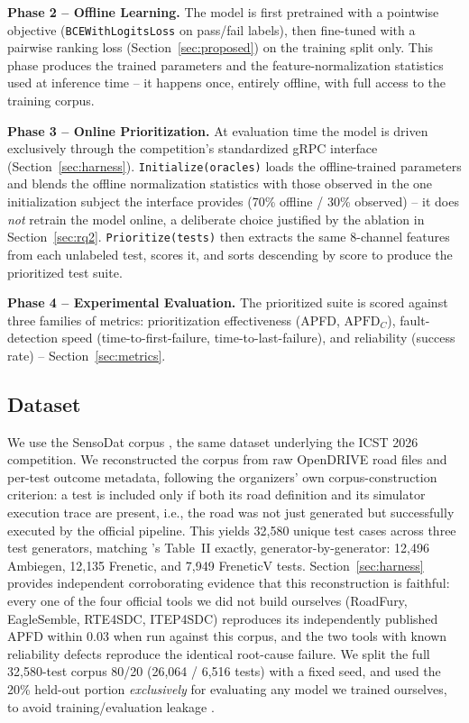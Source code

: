 \documentclass[smallextended]{svjour3}
\begin{document}
\textbf{Phase 2 -- Offline Learning.} The model is first pretrained with a
pointwise objective (\texttt{BCEWithLogitsLoss} on pass/fail labels), then
fine-tuned with a pairwise ranking loss (Section~\ref{sec:proposed}) on the
training split only. This phase produces the trained parameters and the
feature-normalization statistics used at inference time -- it happens once,
entirely offline, with full access to the training corpus.

\textbf{Phase 3 -- Online Prioritization.} At evaluation time the model is
driven exclusively through the competition's standardized gRPC interface
(Section~\ref{sec:harness}). \texttt{Initialize(oracles)} loads the
offline-trained parameters and blends the offline normalization statistics
with those observed in the one initialization subject the interface
provides (70\% offline / 30\% observed) -- it does \emph{not} retrain the
model online, a deliberate choice justified by the ablation in
Section~\ref{sec:rq2}. \texttt{Prioritize(tests)} then extracts the same
8-channel features from each unlabeled test, scores it, and sorts
descending by score to produce the prioritized test suite.

\textbf{Phase 4 -- Experimental Evaluation.} The prioritized suite is scored
against three families of metrics: prioritization effectiveness (APFD,
$\mathrm{APFD}_C$), fault-detection speed (time-to-first-failure,
time-to-last-failure), and reliability (success rate) --
Section~\ref{sec:metrics}.

\subsection{Dataset}
\label{sec:dataset}
We use the SensoDat corpus \citep{birchler2024sensodat}, the same dataset
underlying the ICST 2026 competition. We reconstructed the corpus from raw
OpenDRIVE road files and per-test outcome metadata, following the
organizers' own corpus-construction criterion: a test is included only if
both its road definition and its simulator execution trace are present,
i.e., the road was not just generated but successfully executed by the
official pipeline. This yields 32{,}580 unique test cases across three
test generators, matching \citet{aryan2026icst}'s Table~II exactly,
generator-by-generator: 12{,}496 Ambiegen, 12{,}135 Frenetic, and 7{,}949
FreneticV tests. Section~\ref{sec:harness} provides independent
corroborating evidence that this reconstruction is faithful: every one of
the four official tools we did not build ourselves (RoadFury, EagleSemble,
RTE4SDC, ITEP4SDC) reproduces its independently published APFD within 0.03
when run against this corpus, and the two tools with known reliability
defects reproduce the identical root-cause failure. We split the full
32{,}580-test corpus
80/20 (26{,}064 / 6{,}516 tests) with a fixed seed, and used the 20\%
held-out portion \emph{exclusively} for evaluating any model we trained
ourselves, to avoid training/evaluation leakage
\citep{kaufman2012leakage}.
\end{document}

